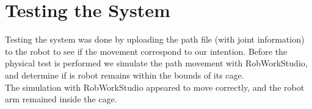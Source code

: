 \section{Testing the System}
\label{sec:test}

Testing the system was done by uploading the path file (with joint information) to the robot to see if the movement correspond to our intention. Before the physical test is performed we simulate the path movement with RobWorkStudio, and determine if is robot remains within the bounds of its cage.\\

The simulation with RobWorkStudio appeared to move correctly, and the robot arm remained inside the cage.